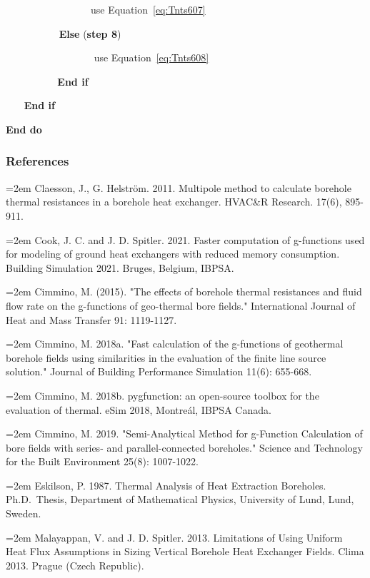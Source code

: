 ~~~~~~~~~~~~~~~~~use Equation~\ref{eq:Tnts607}

~~~~~~~~~~ \textbf{Else} (\textbf{step 8})

~~~~~~~~~~~~~~~~~ use Equation~\ref{eq:Tnts608}

~~~ ~~~~~~ \textbf{End if}

~~~ \textbf{End if}

\textbf{End do}

\subsubsection{References}\label{references-2-006}

\hangindent=2em
\noindent Claesson, J., G. Helstr{\"o}m. 2011. Multipole method to calculate borehole thermal resistances in a borehole heat exchanger. HVAC\&R Research. 17(6), 895-911.

\hangindent=2em
\noindent Cook, J. C. and J. D. Spitler. 2021. Faster computation of g-functions used for modeling of ground heat exchangers with reduced memory consumption. Building Simulation 2021. Bruges, Belgium, IBPSA.

\hangindent=2em
\noindent Cimmino, M. (2015). "The effects of borehole thermal resistances and fluid flow rate on the g-functions of geo-thermal bore fields." International Journal of Heat and Mass Transfer 91: 1119-1127.

\hangindent=2em
\noindent Cimmino, M. 2018a. "Fast calculation of the g-functions of geothermal borehole fields using similarities in the evaluation of the finite line source solution." Journal of Building Performance Simulation 11(6): 655-668.

\hangindent=2em
\noindent Cimmino, M. 2018b. pygfunction: an open-source toolbox for the evaluation of thermal. eSim 2018, Montreál, IBPSA Canada.

\hangindent=2em
\noindent Cimmino, M. 2019. "Semi-Analytical Method for g-Function Calculation of bore fields with series- and parallel-connected boreholes." Science and Technology for the Built Environment 25(8): 1007-1022.

\hangindent=2em
\noindent Eskilson, P. 1987. Thermal Analysis of Heat Extraction Boreholes. Ph.D.~Thesis, Department of Mathematical Physics, University of Lund, Lund, Sweden.

\hangindent=2em
\noindent Malayappan, V. and J. D. Spitler. 2013. Limitations of Using Uniform Heat Flux Assumptions in Sizing Vertical Borehole Heat Exchanger Fields. Clima 2013. Prague (Czech Republic).

